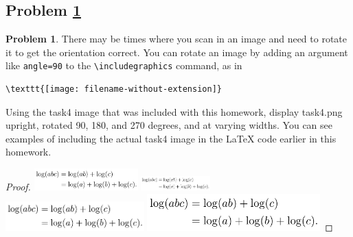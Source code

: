 \documentclass[11pt]{article}
\theoremstyle{definition}
\theoremstyle{definition}
\newtheorem{required}{Problem}
\theoremstyle{definition}
\begin{document}
\subsection{Problem \ref{RotateImage}}
\begin{required} \label{RotateImage}
There may be times where you scan in an image and need to rotate it to get the orientation correct. You can rotate an image by adding an argument like \texttt{angle=90} to the \texttt{\textbackslash includegraphics} command, as in
\begin{verbatim}
\texttt{[image: filename-without-extension]}
\end{verbatim}

Using the task4 image that was included with this homework, display task4.png upright, rotated 90, 180, and 270 degrees, and at varying widths. You can see examples of including the actual task4 image in the LaTeX code earlier in this homework.

\begin{proof}
\includegraphics[width=0.3\textwidth,angle=0]{task4}
\includegraphics[width=0.2\textwidth,angle=90]{task4}
\includegraphics[width=0.4\textwidth,angle=180]{task4}
\includegraphics[width=0.5\textwidth,angle=270]{task4}
\end{proof}

\end{required}

\newpage
\end{document}
